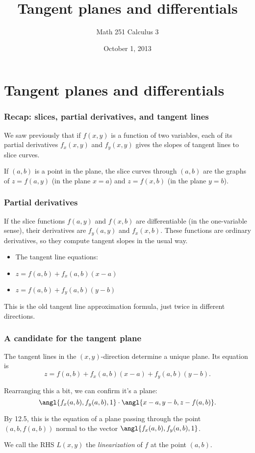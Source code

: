 \documentclass[11pt,ignorenonframetext,]{beamer}
\title{Tangent planes and differentials}
\author{Math 251 Calculus 3}
\date{October 1, 2013}
\begin{document}
\frame{\titlepage}

\section{Tangent planes and differentials}

\begin{frame}\frametitle{Recap: slices, partial derivatives, and tangent
lines}

We saw previously that if $f(x,y)$ is a function of two variables, each
of its partial derivatives $f_x(x,y)$ and $f_y(x,y)$ gives the slopes of
tangent lines to slice curves.

If $(a, b)$ is a point in the plane, the slice curves through $(a,b)$
are the graphs of $z = f(a, y)$ (in the plane $x = a$) and $z = f(x, b)$
(in the plane $y = b$).

\end{frame}

\begin{frame}\frametitle{Partial derivatives}

If the slice functions $f(a, y)$ and $f(x,b)$ are differentiable (in the
one-variable sense), their derivatives are $f_y(a,y)$ and $f_x(x,b)$.
These functions are ordinary derivatives, so they compute tangent slopes
in the usual way.

\begin{itemize}[<+->]
\itemsep1pt\parskip0pt
\item
  The tangent line equations:
\item
  $z = f(a, b) + f_x(a,b)(x - a)$
\item
  $z = f(a, b) + f_y(a,b)(y - b)$
\end{itemize}

This is the old tangent line approximation formula, just twice in
different directions.

\end{frame}

\begin{frame}\frametitle{A candidate for the tangent plane}

The tangent lines in the $(x,y)$-direction determine a unique plane. Its
equation is \[ z = f(a,b) + f_x(a,b)(x-a) + f_y(a,b)(y - b). \]

Rearranging this a bit, we can confirm it's a plane:
\[ \angl{f_x(a,b), f_y(a,b), 1} \cdot \angl{x - a, y - b, z - f(a,b)}. \]

By 12.5, this is the equation of a plane passing through the point
$(a, b, f(a, b))$ normal to the vector $\angl{f_x(a,b), f_y(a,b), 1}$.

We call the RHS $L(x,y)$ the \emph{linearization} of $f$ at the point
$(a,b)$.

\end{frame}
\end{document}
